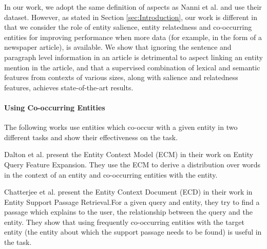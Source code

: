 \documentclass[sigconf,authordraft]{acmart}
\begin{document}

In our work, we adopt the same definition of aspects as Nanni  et al. \cite{nanni2018entity} and use their dataset. However, as stated in Section \ref{sec:Introduction}, our work is different in that we consider the role of entity salience, entity relatedness and co-occurring entities for improving performance when more data (for example, in the form of a newspaper article), is available. We show that ignoring the sentence and paragraph level information in an article is detrimental to aspect linking an entity mention in the article, and that a supervised combination of lexical and semantic features from contexts of various sizes, along with salience and relatedness features, achieves state-of-the-art results.




\paragraph{\textbf{Using Co-occurring Entities}}
The following works use entities which co-occur with a given entity in two different tasks and show their effectiveness on the task. 

Dalton et al. \cite{dalton2014entity} present the Entity Context Model (ECM) in their work on Entity Query Feature Expansion. They use the ECM to derive a distribution over words in the context of an entity and co-occurring entities with the entity.

Chatterjee et al. \cite{chatterjee2019why} present the Entity Context Document (ECD) in their work in Entity Support Passage Retrieval.For a given query and entity, they try to find a passage which explains to the user, the relationship between the query and the entity. They show that using frequently co-occurring entities with the target entity (the entity about which the support passage needs to be found) is useful in the task.
\end{document}
